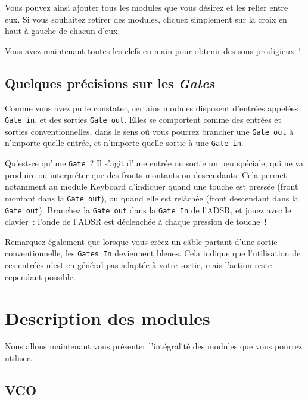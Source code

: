 \documentclass[a4paper,oneside,frenchb,10pt]{article}
\begin{document}
Vous pouvez ainsi ajouter tous les modules que vous désirez et les
relier entre eux. Si vous souhaitez retirer des modules, cliquez
simplement sur la croix en haut à gauche de chacun d'eux.

Vous avez maintenant toutes les clefs en main pour obtenir des sons
prodigieux~!

\subsection{Quelques précisions sur les \emph{Gates}}

Comme vous avez pu le constater, certains modules disposent d'entrées
appelées \verb!Gate in!, et des sorties \verb!Gate out!. Elles se
comportent comme des entrées et sorties conventionnelles, dans le sens
où vous pourrez brancher une \verb!Gate out! à n'importe quelle entrée,
et n'importe quelle sortie à une \verb!Gate in!.

Qu'est-ce qu'une \verb!Gate!~? Il s'agit d'une entrée ou sortie un peu
spéciale, qui ne va produire ou interpréter que des fronts montants ou
descendants. Cela permet notamment au module Keyboard d'indiquer quand
une touche est pressée (front montant dans la \verb!Gate out!), ou quand
elle est relâchée (front descendant dans la \verb!Gate out!). Branchez
la \verb!Gate out! dans la \verb!Gate In! de l'ADSR, et jouez avec le
clavier~: l'onde de l'ADSR est déclenchée à chaque pression de touche~!

Remarquez également que lorsque vous créez un câble partant d'une sortie
conventionnelle, les \verb!Gates In! deviennent bleues. Cela indique que
l'utilisation de ces entrées n'est en général pas adaptée à votre
sortie, mais l'action reste cependant possible.

\section{Description des modules}

Nous allons maintenant vous présenter l'intégralité des modules que vous
pourrez utiliser.

\subsection{VCO}
\end{document}
